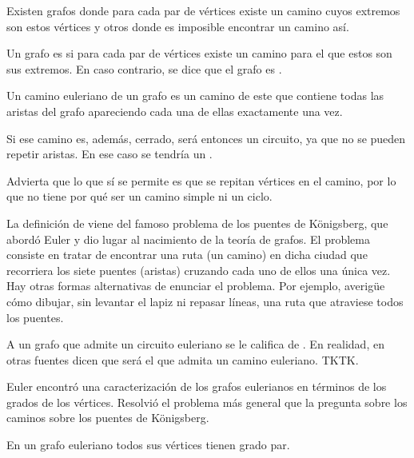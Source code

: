 Existen grafos donde para cada par de vértices existe un camino cuyos
extremos son estos vértices y otros donde es imposible encontrar un camino
así.

\begin{deffinition}
  Un grafo es  si para cada par de vértices existe un camino para
  el que estos son sus extremos. En caso contrario, se dice que el grafo es
  .
\end{deffinition}

\begin{deffinition}
  Un camino euleriano de un grafo es un camino de este que contiene todas
  las aristas del grafo apareciendo cada una de ellas exactamente una vez.
\end{deffinition}

Si ese camino es, además, cerrado, será entonces un circuito, ya que no se
pueden repetir aristas. En ese caso se tendría un .

Advierta que lo que sí se permite es que se repitan vértices en el camino,
por lo que no tiene por qué ser un camino simple ni un ciclo.

La definición de  viene del famoso problema de los
puentes de Königsberg, que abordó Euler y dio lugar al nacimiento de la
teoría de grafos. El problema consiste en tratar de encontrar una ruta (un
camino) en dicha ciudad que recorriera los siete puentes (aristas) cruzando
cada uno de ellos una única vez. Hay otras formas alternativas de enunciar
el problema. Por ejemplo, averigüe cómo dibujar, sin levantar el lapiz ni
repasar líneas, una ruta que atraviese todos los puentes.

A un grafo que admite un circuito euleriano se le califica de . En realidad, en otras fuentes dicen que será el que admita un
camino euleriano. TKTK.

Euler encontró una caracterización de los grafos eulerianos en términos de
los grados de los vértices. Resolvió el problema más general que la pregunta
sobre los caminos sobre los puentes de Königsberg.

\begin{lemma}\label{lema-g-eul-grado-par}
  En un grafo euleriano todos sus vértices tienen grado par.
\end{lemma}

